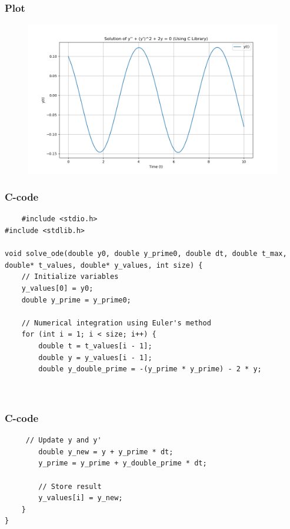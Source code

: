 \documentclass{beamer}
\begin{document}
\begin{frame}
\frametitle{Plot}
\begin{figure}
    \centering
    \includegraphics[width=0.7\linewidth]{Fig 9.1.9.png}
\end{figure}
\end{frame}
\begin{frame}[fragile]
\frametitle{C-code}
\begin{verbatim}
    #include <stdio.h>
#include <stdlib.h>

void solve_ode(double y0, double y_prime0, double dt, double t_max, double* t_values, double* y_values, int size) {
    // Initialize variables
    y_values[0] = y0;
    double y_prime = y_prime0;

    // Numerical integration using Euler's method
    for (int i = 1; i < size; i++) {
        double t = t_values[i - 1];
        double y = y_values[i - 1];
        double y_double_prime = -(y_prime * y_prime) - 2 * y;

       

 \end{verbatim}   
 \end{frame}
 \begin{frame}[fragile]
 \frametitle{C-code}
   \begin{verbatim}  
     // Update y and y'
        double y_new = y + y_prime * dt;
        y_prime = y_prime + y_double_prime * dt;

        // Store result
        y_values[i] = y_new;
    }
}
\end{verbatim}
\end{frame}
\end{document}
